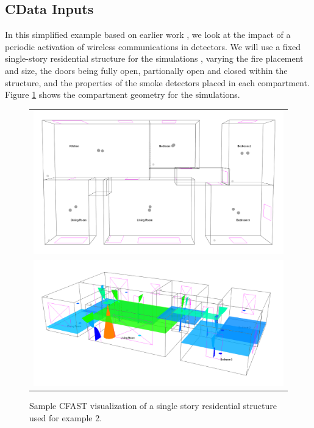 \documentclass[12pt,twoside]{book}
\begin{document}
\subsection{CData Inputs}
In this simplified example based on earlier work \cite{Cleary_2019}, we look at the impact of a periodic activation of wireless communications in detectors. We will use a fixed single-story residential structure for the simulations \cite{Madrzykowski:2019}, varying the fire placement and size, the doors being fully open, partionally open and closed within the structure, and the properties of the smoke detectors placed in each compartment. Figure \ref{detector_geometry} shows the compartment geometry for the simulations.

\begin{figure}[!ht]
\centering
\begin{tabular*}{\textwidth}{c}
\includegraphics[width=6.0in]{FIGURES/Detectors.png} \\
\includegraphics[width=6.0in]{FIGURES/Detectors_Running.png}
\end{tabular*}
\caption{Sample CFAST visualization of a single story residential structure used for example 2.}
\label{detector_geometry}
\end{figure}
\end{document}
